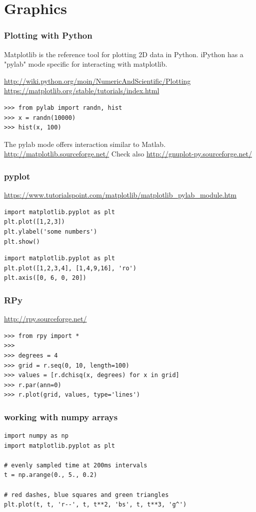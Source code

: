 \documentclass{beamer}
\begin{document}
\section{Graphics}

\begin{frame}[containsverbatim]
\frametitle{Plotting with Python}
Matplotlib is the reference tool for plotting 2D data in Python. iPython has a "pylab" mode specific for interacting with matplotlib.

\url{http://wiki.python.org/moin/NumericAndScientific/Plotting}
\url{https://matplotlib.org/stable/tutorials/index.html}

\begin{lstlisting}
>>> from pylab import randn, hist
>>> x = randn(10000)
>>> hist(x, 100)
\end{lstlisting}
The pylab mode offers interaction similar to Matlab.
\url{http://matplotlib.sourceforge.net/}
Check also \url{http://gnuplot-py.sourceforge.net/}
\end{frame}

\begin{frame}[containsverbatim]
\frametitle{pyplot}
\url{https://www.tutorialspoint.com/matplotlib/matplotlib_pylab_module.htm}
\begin{lstlisting}
import matplotlib.pyplot as plt
plt.plot([1,2,3])
plt.ylabel('some numbers')
plt.show()
\end{lstlisting}
\begin{lstlisting}
import matplotlib.pyplot as plt
plt.plot([1,2,3,4], [1,4,9,16], 'ro')
plt.axis([0, 6, 0, 20])
\end{lstlisting}
\end{frame}

\begin{frame}[containsverbatim]
\frametitle{RPy}
\url{http://rpy.sourceforge.net/}
\begin{lstlisting}
>>> from rpy import *
>>>
>>> degrees = 4
>>> grid = r.seq(0, 10, length=100)
>>> values = [r.dchisq(x, degrees) for x in grid]
>>> r.par(ann=0)
>>> r.plot(grid, values, type='lines')
\end{lstlisting}
\end{frame}

\begin{frame}[containsverbatim]
\frametitle{working with numpy arrays}
\begin{lstlisting}
import numpy as np
import matplotlib.pyplot as plt

# evenly sampled time at 200ms intervals
t = np.arange(0., 5., 0.2)

# red dashes, blue squares and green triangles
plt.plot(t, t, 'r--', t, t**2, 'bs', t, t**3, 'g^')
\end{lstlisting}
\end{frame}
\end{document}
